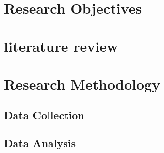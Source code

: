 \section{Research Objectives}

\section{literature review}

\section{Research Methodology}

\subsection{Data Collection}

\subsection{Data Analysis}

